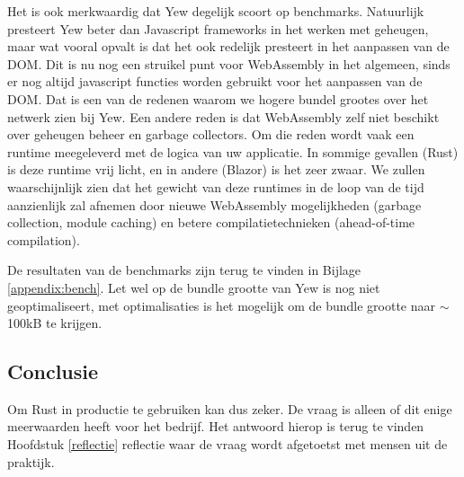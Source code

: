 Het is ook merkwaardig dat Yew degelijk scoort op benchmarks. Natuurlijk presteert Yew beter dan
Javascript frameworks in het werken met geheugen, maar wat vooral opvalt is dat het ook redelijk
presteert in het aanpassen van de DOM. Dit is nu nog een struikel punt voor WebAssembly in het
algemeen, sinds er nog altijd javascript functies worden gebruikt voor het aanpassen van de DOM.
Dat is een van de redenen waarom we hogere bundel grootes over het netwerk zien bij Yew.
Een andere reden is dat WebAssembly zelf niet beschikt over geheugen beheer en garbage collectors.
Om die reden wordt vaak een runtime meegeleverd met de logica van uw applicatie. In sommige gevallen
(Rust) is deze runtime vrij licht, en in andere (Blazor) is het zeer zwaar. We zullen waarschijnlijk
zien dat het gewicht van deze runtimes in de loop van de tijd aanzienlijk zal afnemen door nieuwe
WebAssembly mogelijkheden (garbage collection, module caching) en betere compilatietechnieken
(ahead-of-time compilation).

De resultaten van de benchmarks zijn terug te vinden in Bijlage \ref{appendix:bench}. Let wel op de
bundle grootte van Yew is nog niet geoptimaliseert, met optimalisaties is het mogelijk om de bundle
grootte naar $\sim$100kB te krijgen.

\subsection{Conclusie}

Om Rust in productie te gebruiken kan dus zeker. De vraag is alleen of dit enige meerwaarden heeft
voor het bedrijf. Het antwoord hierop is terug te vinden Hoofdstuk \ref{reflectie} reflectie waar
de vraag wordt afgetoetst met mensen uit de praktijk.
